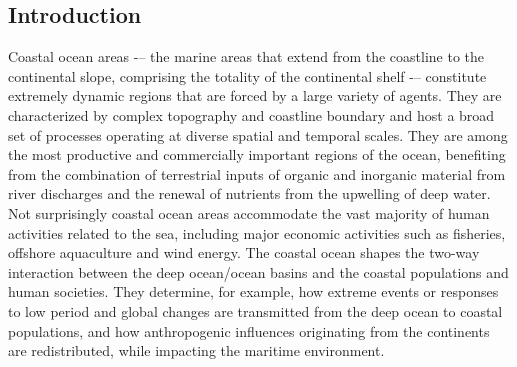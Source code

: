 \subsection{Introduction}

Coastal ocean areas -– the marine areas that extend from the coastline
to the continental slope, comprising the totality of the continental
shelf -– constitute extremely dynamic regions that are forced by a
large variety of agents. They are characterized by complex topography
and coastline boundary and host a broad set of processes operating at
diverse spatial and temporal scales. They are among the most
productive and commercially important regions of the ocean, benefiting
from the combination of terrestrial inputs of organic and inorganic
material from river discharges and the renewal of nutrients from the
upwelling of deep water. Not surprisingly coastal ocean areas
accommodate the vast majority of human activities related to the sea,
including major economic activities such as fisheries, offshore
aquaculture and wind energy. The coastal ocean shapes the two-way
interaction between the deep ocean/ocean basins and the coastal
populations and human societies. They determine, for example, how
extreme events or responses to low period and global changes are
transmitted from the deep ocean to coastal populations, and how
anthropogenic influences originating from the continents are
redistributed, while impacting the maritime environment. %
 


